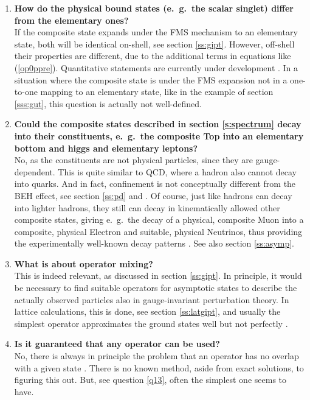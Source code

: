 \documentclass[final,twoside,12pt]{article}
\newcommand*{\pref}[1]{(\ref{#1})}
\newcommand*{\1}{1\!\!\!\bot}
\begin{document}
\begin{enumerate}
 \item {\bf How do the physical bound states (e.\ g.\ the scalar singlet) differ from the elementary ones?}\\
 If the composite state expands under the FMS mechanism to an elementary state, both will be identical on-shell, see section \ref{ss:gipt}. However, off-shell their properties are different, due to the additional terms in equations like \pref{op0ppre}. Quantitative statements are currently under development \cite{Raubitzek:unpublished,Maas:unpublished}. In a situation where the composite state is under the FMS expansion not in a one-to-one mapping to an elementary state, like in the example of section \ref{sss:gut}, this question is actually not well-defined.
 
 \item {\bf Could the composite states described in section \ref{s:spectrum} decay into their constituents, e.\ g.\ the composite Top into an elementary bottom and higgs and elementary leptons?}\\
 No, as the constituents are not physical particles, since they are gauge-dependent. This is quite similar to QCD, where a hadron also cannot decay into quarks. And in fact, confinement is not conceptually different from the BEH effect, see section \ref{ss:pd} and \cite{Osterwalder:1977pc,Seiler:2015rwa,Fradkin:1978dv}. Of course, just like hadrons can decay into lighter hadrons, they still can decay in kinematically allowed other composite states, giving e.\ g.\ the decay of a physical, composite Muon into a composite, physical Electron and suitable, physical Neutrinos, thus providing the experimentally well-known decay patterns \cite{pdg}. See also section \ref{ss:asymp}.
 
 \item\label{q13} {\bf What is about operator mixing?}\\
 This is indeed relevant, as discussed in section \ref{ss:gipt}. In principle, it would be necessary to find suitable operators for asymptotic states to describe the actually observed particles also in gauge-invariant perturbation theory. In lattice calculations, this is done, see section \ref{ss:latgipt}, and usually the simplest operator approximates the ground states well \cite{Wurtz:2013ova,Maas:2014pba,Maas:unpublishedtoerek} but not perfectly \cite{Raubitzek:unpublished}.
 
 \item {\bf Is it guaranteed that any operator can be used?}\\
 No, there is always in principle the problem that an operator has no overlap with a given state \cite{Gattringer:2010zz,DeGrand:2006zz}. There is no known method, aside from exact solutions, to figuring this out. But, see question \ref{q13}, often the simplest one seems to have.
 

\end{enumerate}
\end{document}

